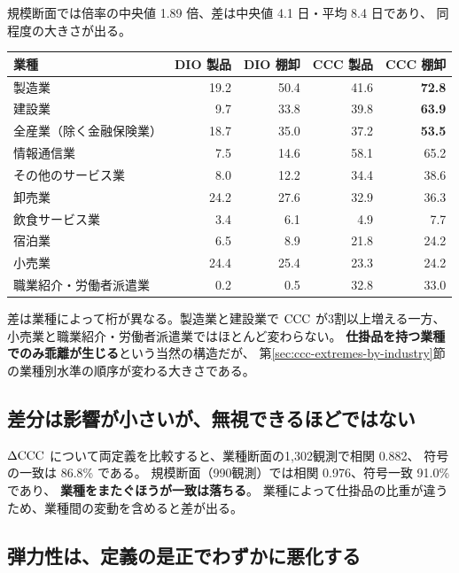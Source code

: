 規模断面では倍率の中央値 1.89 倍、差は中央値 4.1 日・平均 8.4 日であり、
同程度の大きさが出る。

\begin{center}
\begin{tabular}{@{}lrrrr@{}}
\toprule
業種 & DIO 製品 & DIO 棚卸 & CCC 製品 & CCC 棚卸 \\
\midrule
製造業 & 19.2 & 50.4 & 41.6 & \textbf{72.8} \\
建設業 & 9.7 & 33.8 & 39.8 & \textbf{63.9} \\
全産業（除く金融保険業） & 18.7 & 35.0 & 37.2 & \textbf{53.5} \\
情報通信業 & 7.5 & 14.6 & 58.1 & 65.2 \\
その他のサービス業 & 8.0 & 12.2 & 34.4 & 38.6 \\
卸売業 & 24.2 & 27.6 & 32.9 & 36.3 \\
飲食サービス業 & 3.4 & 6.1 & 4.9 & 7.7 \\
宿泊業 & 6.5 & 8.9 & 21.8 & 24.2 \\
小売業 & 24.4 & 25.4 & 23.3 & 24.2 \\
職業紹介・労働者派遣業 & 0.2 & 0.5 & 32.8 & 33.0 \\
\bottomrule
\end{tabular}
\label{tab:inventory-scope}
\end{center}

差は業種によって桁が異なる。製造業と建設業で $\mathrm{CCC}$ が3割以上増える一方、
小売業と職業紹介・労働者派遣業ではほとんど変わらない。
\textbf{仕掛品を持つ業種でのみ乖離が生じる}という当然の構造だが、
第\ref{sec:ccc-extremes-by-industry}節の業種別水準の順序が変わる大きさである。

\subsection{差分は影響が小さいが、無視できるほどではない}

$\Delta\mathrm{CCC}$ について両定義を比較すると、業種断面の1,302観測で相関 0.882、
符号の一致は 86.8\% である。
規模断面（990観測）では相関 0.976、符号一致 91.0\% であり、
\textbf{業種をまたぐほうが一致は落ちる}。
業種によって仕掛品の比重が違うため、業種間の変動を含めると差が出る。

\subsection{弾力性は、定義の是正でわずかに悪化する}

